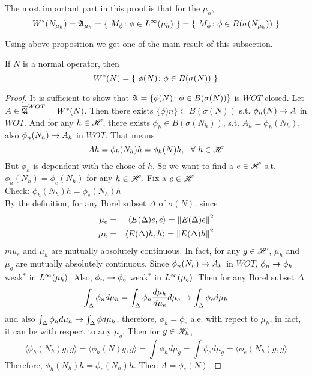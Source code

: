 \documentclass[a4paper,11pt]{report}
\begin{document}
\begin{rem}
	The most important part in this proof is that for the $\mu_h$,
	\begin{equation*}
		W^{*}(N_{\mu_h}) = \mathfrak{A}_{\mu_h} = \{~M_{\phi} \colon \phi \in L^{\infty}(\mu_h)~\} = \{~M_{\phi} \colon \phi \in B(\sigma(N_{\mu_h}))~\}
	\end{equation*}
\end{rem}

Using above proposition we get one of the main result of this subsection.
\begin{thm}
	If $N$ is a normal operator, then 
	\begin{equation*}
		W^{*}(N) = \{~\phi(N) \colon \phi \in B(\sigma(N))~\}
	\end{equation*}
\end{thm}
\begin{proof}
	It is sufficient to show that $\mathfrak{A} = \{\phi(N) \colon \phi \in B(\sigma(N))\}$ is $WOT$-closed. Let $A \in \overline{\mathfrak{A}}^{WOT} = W^{*}(N)$. Then there exists $\{\phi)n\} \subset B(\sigma(N))$ s.t. $\phi_n(N) \rightarrow A$ in $WOT$. And for any $h \in \mathscr{H}$, there exists $\phi_h \in B(\sigma(N_h))$, s.t. $A_h = \phi_h(N_h)$, also $\phi_n(N_h) \rightarrow A_h$ in $WOT$. That means 
	\begin{equation*}
		Ah = \phi_h(N_h)h = \phi_h(N)h,~~\forall~h \in \mathscr{H}
	\end{equation*}
	But $\phi_h$ is dependent with the chose of $h$. So we want to find a $e \in \mathscr{H}$ s.t. $\phi_h(N_h) = \phi_e(N_h)$ for any $h \in \mathscr{H}$. Fix a $e \in \mathscr{H}$ \\
	Check: $\phi_h(N_h)h = \phi_e(N_h)h$ \\
	By the definition, for any Borel subset $\Delta$ of $\sigma(N)$, since
	\begin{eqnarray*}
		\mu_e &=& \langle E(\Delta)e,e \rangle = \left\lVert E(\Delta)e\right\lVert^2 \\
		\mu_h &=& \langle E(\Delta)h,h \rangle = \left\lVert E(\Delta)h\right\lVert^2
	\end{eqnarray*}
	$mu_e$ and $\mu_h$ are mutually absolutely continuous. In fact, for any $g \in \mathscr{H}$, $\mu_h$ and $\mu_g$ are mutually absolutely continuous. Since $\phi_n(N_h) \rightarrow A_h$ in $WOT$, $\phi_n \rightarrow \phi_h$ weak$^{*}$ in $L^{\infty}(\mu_h)$. Also, $\phi_n \rightarrow \phi_e$ weak$^{*}$ in $L^{\infty}(\mu_e)$. Then for any Borel subset $\Delta$
	\begin{equation*}
		\int_{\Delta} \phi_n d\mu_h = \int_{\Delta} \phi_n \frac{d\mu_h}{d\mu_e}d\mu_e \rightarrow \int_{\Delta} \phi_e d\mu_h
	\end{equation*}
	and also $\int_{\Delta} \phi_n d\mu_h \rightarrow \int_{\Delta} \phi d\mu_h$, therefore, $\phi_h = \phi_e$ a.e. with repect to $\mu_h$, in fact, it can be with respect to any $\mu_g$. Then for $g \in \mathscr{H}_h$,
	\begin{equation*}
		\langle \phi_h(N_h)g,g \rangle = \langle \phi_h(N)g,g \rangle = \int \phi_h d\mu_g = \int \phi_e d\mu_g = \langle \phi_e(N_h)g,g \rangle
	\end{equation*}
	Therefore, $\phi_h(N_h)h = \phi_e(N_h)h$. Then $A = \phi_e(N)$.
\end{proof} 
\end{document}
